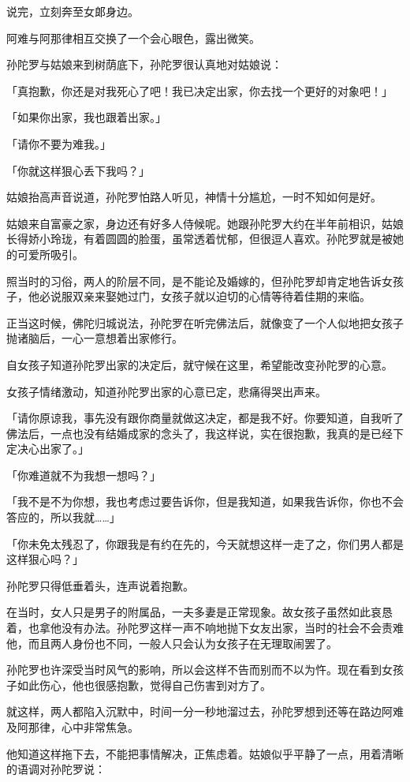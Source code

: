 \documentclass[twoside,openany]{book}
\begin{document}
说完，立刻奔至女郞身边。

阿难与阿那律相互交换了一个会心眼色，露出微笑。

孙陀罗与姑娘来到树荫底下，孙陀罗很认真地对姑娘说：

「真抱歉，你还是对我死心了吧！我已决定出家，你去找一个更好的对象吧！」

「如果你出家，我也跟着出家。」

「请你不要为难我。」

「你就这样狠心丢下我吗？」

姑娘抬高声音说道，孙陀罗怕路人听见，神情十分尴尬，一时不知如何是好。

姑娘来自富豪之家，身边还有好多人侍候呢。她跟孙陀罗大约在半年前相识，姑娘长得娇小玲珑，有着圆圆的脸蛋，虽常透着忧郁，但很逗人喜欢。孙陀罗就是被她的可爱所吸引。

照当时的习俗，两人的阶层不同，是不能论及婚嫁的，但孙陀罗却肯定地告诉女孩子，他必说服双亲来娶她过门，女孩子就以迫切的心情等待着佳期的来临。

正当这时候，佛陀归城说法，孙陀罗在听完佛法后，就像变了一个人似地把女孩子抛诸脑后，一心一意想着出家修行。

自女孩子知道孙陀罗出家的决定后，就守候在这里，希望能改变孙陀罗的心意。

女孩子情绪激动，知道孙陀罗出家的心意已定，悲痛得哭出声来。

「请你原谅我，事先没有跟你商量就做这决定，都是我不好。你要知道，自我听了佛法后，一点也没有结婚成家的念头了，我这样说，实在很抱歉，我真的是已经下定决心出家了。」

「你难道就不为我想一想吗？」

「我不是不为你想，我也考虑过要告诉你，但是我知道，如果我告诉你，你也不会答应的，所以我就……」

「你未免太残忍了，你跟我是有约在先的，今天就想这样一走了之，你们男人都是这样狠心吗？」

孙陀罗只得低垂着头，连声说着抱歉。

在当时，女人只是男子的附属品，一夫多妻是正常现象。故女孩子虽然如此哀恳着，也拿他没有办法。孙陀罗这样一声不响地抛下女友出家，当时的社会不会责难他，而且两人身份也不同，一般人只会认为女孩子在无理取闹罢了。

孙陀罗也许深受当时风气的影响，所以会这样不告而别而不以为忤。现在看到女孩子如此伤心，他也很感抱歉，觉得自己伤害到对方了。

就这样，两人都陷入沉默中，时间一分一秒地溜过去，孙陀罗想到还等在路边阿难及阿那律，心中非常焦急。

他知道这样拖下去，不能把事情解决，正焦虑着。姑娘似乎平静了一点，用着清晰的语调对孙陀罗说：
\end{document}
